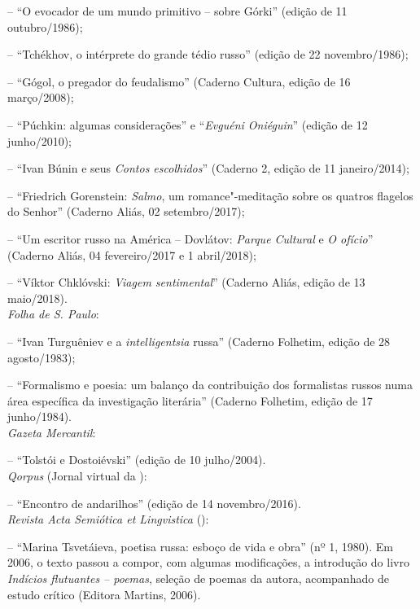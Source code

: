 {{{\noindent{}-- ``O evocador de um mundo primitivo -- sobre Górki'' (edição de 11 outubro/1986);

\noindent{}-- ``Tchékhov, o intérprete do grande tédio russo'' (edição de 22 novembro/1986); 

\noindent{}-- ``Gógol, o pregador do feudalismo'' (Caderno Cultura, edição de 16 março/2008); 

\noindent{}-- ``Púchkin: algumas considerações'' e ``\emph{Evguéni Oniéguin}'' (edição de 12 junho/2010); 

\noindent{}-- ``Ivan Búnin e seus \emph{Contos escolhidos}'' (Caderno 2, edição de 11 janeiro/2014); 

\noindent{}-- ``Friedrich Gorenstein: \emph{Salmo}, um romance"-meditação sobre os quatros flagelos do Senhor'' (Caderno Aliás, 02 setembro/2017); 

\noindent{}-- ``Um escritor russo na América -- Dovlátov: \emph{Parque Cultural} e \emph{O ofício}'' (Caderno Aliás, 04 fevereiro/2017 e 1 abril/2018); 

\noindent{}-- ``Víktor Chklóvski: \emph{Viagem sentimental}'' (Caderno Aliás, edição de 13 maio/2018). \\

\noindent{}\emph{Folha de S. Paulo}:

\noindent{}-- ``Ivan Turguêniev e a \emph{intelligentsia} russa'' (Caderno Folhetim, edição de 28 agosto/1983);

\noindent{}-- ``Formalismo e poesia: um balanço da contribuição dos formalistas russos numa
área específica da investigação literária'' (Caderno Folhetim, edição de 17 junho/1984). \\

\noindent{}\emph{Gazeta Mercantil}:

\noindent{}-- ``Tolstói e Dostoiévski'' (edição de 10 julho/2004). \\

\noindent{}\emph{Qorpus} (Jornal virtual da ):

\noindent{}-- ``Encontro de andarilhos'' (edição de 14 novembro/2016). \\

\noindent{}\emph{Revista Acta Semiótica et Lingvistica} ():

\noindent{}-- ``Marina Tsvetáieva, poetisa russa: esboço de vida e obra'' (nº 1, 1980). Em 2006, o texto passou a compor, com algumas modificações, a introdução do livro \emph{Indícios flutuantes -- poemas}, seleção de poemas da autora, acompanhado de estudo crítico (Editora Martins, 2006). \\

}}}
